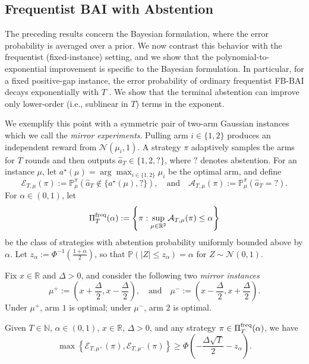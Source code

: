 \documentclass[10pt]{article}
\theoremstyle{plain}
\begin{document}
\subsection{Frequentist BAI with Abstention}
\label{subsec:frequentist-abstention}

The preceding results concern the Bayesian formulation, where the error probability is
averaged over a  prior. 
We now contrast this behavior with the frequentist (fixed-instance) setting, and we show that the polynomial-to-exponential improvement is specific to the Bayesian formulation. 
In particular, for a fixed positive-gap instance,  the error probability of ordinary frequentist FB-BAI decays exponentially with \(T\) \citep{audibert2010best,carpentier2016tight, kaufmann2016complexity}. 
We show that the terminal abstention can improve only lower-order (i.e., sublinear in $T$)
terms in the exponent.

We exemplify this point with a symmetric pair of two-arm Gaussian instances which we call the \emph{mirror
experiments}. Pulling arm \(i\in\{1,2\}\) produces an independent reward from
\(\mathcal N(\mu_i,1)\). A strategy \(\pi\) adaptively samples the arms for \(T\) rounds
and then outputs $\hat a_T\in\{1,2,?\}$,
where \(?\) denotes abstention. For an instance \(\mu\), let
\(a^\star(\mu)=\arg\max_{i\in\{1,2\}}\mu_i\) be the optimal arm, and
define
\[
    \mathcal E_{T,\mu}(\pi)
    :=
    \mathbb P_\mu^\pi\!\left(
        \hat a_T\notin \{a^\star(\mu),?\}
    \right),
    \quad\mbox{and}\quad
    \mathcal A_{T,\mu}(\pi)
    :=
    \mathbb P_\mu^\pi(\hat a_T=?).
\]
For \(\alpha\in(0,1)\), let
\[
    \Pi_T^{\rm freq}(\alpha)
    :=
    \left\{
        \pi:
        \sup_{\mu\in\mathbb R^2}
        \mathcal A_{T,\mu}(\pi)\le \alpha
    \right\}
\]
be the class of strategies with  abstention probability uniformly bounded above by $\alpha$.
Let $z_\alpha
    :=
    \Phi^{-1}\!\left(\frac{1+\alpha}{2}\right)$,
so that \(\mathbb P(|Z|\le z_\alpha)=\alpha\) for
\(Z\sim\mathcal N(0,1)\).

Fix \(x\in\mathbb R\) and \(\Delta>0\), and consider the following two \emph{mirror instances}
\[
    \mu^+
    :=
    \left(
        x+\frac{\Delta}{2},
        x-\frac{\Delta}{2}
    \right),
    \quad\mbox{and}\quad
    \mu^-
    :=
    \left(
        x-\frac{\Delta}{2},
        x+\frac{\Delta}{2}
    \right).
\]
Under \(\mu^+\), arm \(1\) is optimal; under \(\mu^-\), arm \(2\) is optimal.

\begin{theorem}
\label{thm:two-arm-frequentist-abstention}
Given \(T\in\mathbb N\), \(\alpha\in(0,1)\), \(x\in\mathbb R\),
\(\Delta>0\), and any strategy
\(\pi\in\Pi_T^{\rm freq}(\alpha)\), we have
\[
    \max\left\{
        \mathcal E_{T,\mu^+}(\pi),
        \mathcal E_{T,\mu^-}(\pi)
    \right\}
    \ge
    \Phi\!\left(
        -\frac{\Delta\sqrt T}{2}-z_\alpha
    \right).
\]
\end{theorem}
\end{document}
